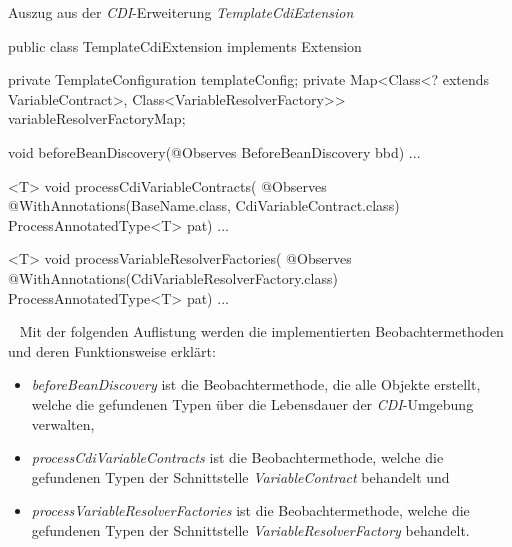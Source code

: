 \begin{program}
\caption{Auszug aus der \emph{CDI}-Erweiterung \emph{TemplateCdiExtension}}
\label{prog:templateCdiExtension}
\begin{JavaCode}
public class TemplateCdiExtension implements Extension {

    private TemplateConfiguration templateConfig;
    private Map<Class<? extends VariableContract>, 
                Class<VariableResolverFactory>>  
                      variableResolverFactoryMap;

    void beforeBeanDiscovery(@Observes BeforeBeanDiscovery bbd) { ... }

    <T> void processCdiVariableContracts(
              @Observes @WithAnnotations({BaseName.class, 
                                          CdiVariableContract.class})
              ProcessAnnotatedType<T> pat) { ... }

    <T> void processVariableResolverFactories(
         @Observes @WithAnnotations(CdiVariableResolverFactory.class)
         ProcessAnnotatedType<T> pat) { ... }
         
}
\end{JavaCode}
\end{program}
\ \newline
Mit der folgenden Auflistung werden die implementierten Beobachtermethoden und deren Funktionsweise erklärt:
\begin{itemize}
	\item\emph{beforeBeanDiscovery} ist die Beobachtermethode, die alle Objekte erstellt, welche die gefundenen Typen über die Lebensdauer der \emph{CDI}-Umgebung verwalten,
	\item\emph{processCdiVariableContracts} ist die Beobachtermethode, welche die gefundenen Typen der Schnittstelle \emph{VariableContract} behandelt und
	\item\emph{processVariableResolverFactories} ist die Beobachtermethode, welche die gefundenen Typen der Schnittstelle \emph{VariableResolverFactory} behandelt.
\end{itemize}

